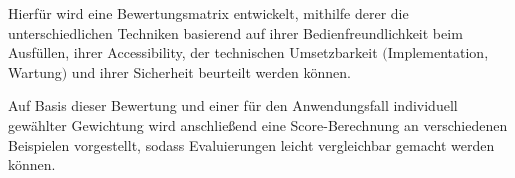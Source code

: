 Hierfür wird eine Bewertungsmatrix entwickelt, mithilfe derer die unterschiedlichen Techniken basierend auf
ihrer Bedienfreundlichkeit beim Ausfüllen, ihrer Accessibility, der technischen Umsetzbarkeit $($Implementation, Wartung$)$ und ihrer Sicherheit beurteilt werden können.

Auf Basis dieser Bewertung und einer für den Anwendungsfall individuell gewählter Gewichtung wird anschließend eine Score-Berechnung 
an verschiedenen Beispielen vorgestellt, sodass Evaluierungen leicht vergleichbar gemacht werden können.